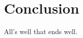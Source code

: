 \documentclass{icmmcm}
\begin{document}
\section{Conclusion}

All's well that ends well.






\end{document}
